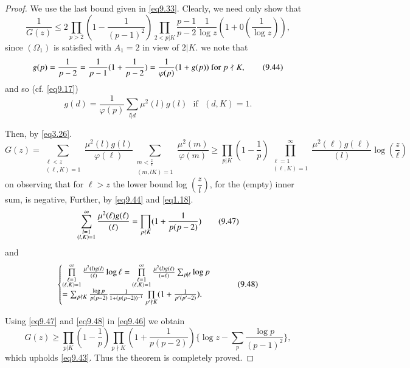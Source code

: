 \begin{proof}%
We use the last bound given in \eqref{eq9.33}. Clearly, we need only
show that  
\begin{equation*}
\frac{1}{G(z)} \leq 2 \prod_{p>2}(1-\frac{1}{(p-1)^2})  \prod_{2<p|K}
\frac{p-1}{p-2} \frac{1}{\log z}(1+0 (\frac{1}{\log
  z})),\tag{9.43}\label{eq9.43} 
\end{equation*}\pageoriginale
since $(\Omega_1)$ is satisfied with $A_1 = 2$ in view of $2|K$. we
note that  
\begin{equation*}
g(p) = \frac{1}{p-2}=\frac{1}{p-1}(1+\frac{1}{p-2})=
\frac{1}{\varphi(p)}(1+g(p)) \text{ for } p\not\mid
K,\tag{9.44}\label{eq9.44}  
\end{equation*}
and so (cf. \eqref{eq9.17})
\begin{equation*}
g(d) = \frac{1}{\varphi(p)} \sum_{l|d}\mu^2 (l) g(l) \text{~ if~ } (d,K)
= 1.\tag{9.45}\label{eq9.45} 
\end{equation*}

Then, by \eqref{eq3.26}.
{\fontsize{10pt}{12pt}\selectfont
\begin{equation*}
G(z)= \sum \limits_{\substack{\ell< z \\ (\ell,K) =1}}
\frac{\mu^2(l)g(l)}{\varphi (\ell)} \sum \limits_{\substack{m<
    \frac{z}{\ell} \\ (m,lK) =1}} \frac{\mu^2(m)}{\varphi (m)}\geq
\prod_{p|K}(1-\frac{1}{p}) \prod \limits^{\infty}_{\substack{\ell=1
    \\ (\ell,K) =1}} \frac{\mu^2(\ell)g(\ell)}{ (l)} \log
(\frac{z}{\ell})\tag{9.46}\label{eq9.46} 
\end{equation*}}\relax
on observing that for $\ell > z$ the lower bound log
$(\dfrac{z}{l})$, for the (empty) inner sum, is negative, Further, by
\eqref{eq9.44} and \eqref{eq1.18}. 
\begin{equation*}
\sum^{\infty}_{\substack{l=1 \\ (l,K) =1}} \frac{\mu^2(\ell)g(\ell)}{
  (\ell)} = \prod_{p \not\mid K}(1+
\frac{1}{p(p-2)})\tag{9.47}\label{eq9.47} 
\end{equation*}
and 
\begin{equation*}
\begin{cases}
\prod\limits^{\infty}_{\substack{\ell=1 \\ (\ell,K) =1}}
\frac{\mu^2(l)g(l)}{ (\ell)} \log \ell =
\prod\limits^{\infty}_{\substack{\ell=1 \\ (\ell,K) =1}} 
\frac{\mu^2(l)g(\ell)}{ (=\ell)} \sum_{p|\ell} \log p\\
= 
\sum_{ p \not\mid K} \frac{\log p}{p(p-2)} \frac{1}{1+(p(p-2))^{-1}}
\prod\limits_{p' \nmid K}(1+ \frac{1}{p'(p'-2)}). 
\end{cases}\tag{9.48}\label{eq9.48}
\end{equation*}

Using \eqref{eq9.47} and \eqref{eq9.48} in \eqref{eq9.46} we obtain 
\begin{equation*}
G(z) \geq \prod_{p|K} (1- \frac{1}{p})\prod_{p \nmid K} (1+
\frac{1}{p(p-2)})  \{ \log z - \sum_p \frac{\log p}{(p-1)^2}
\},\tag{9.49}\label{eq9.49}   
\end{equation*}
which upholds \eqref{eq9.43}. Thus the theorem is completely proved. 
\end{proof}

